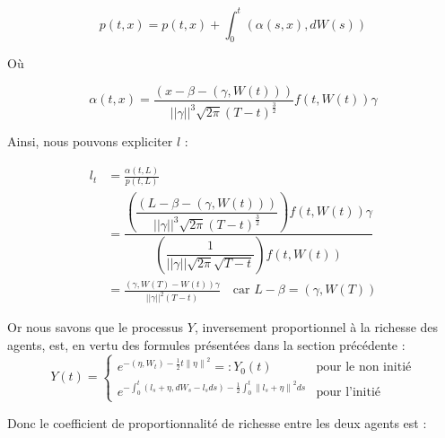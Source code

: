 \documentclass[../finalreport.tex]{subfiles}
\begin{document}
\begin{displaymath}
p \left( t, x \right) = p \left( t, x \right) + \int_0^t \left( \alpha \left(s, x \right), dW \left( s \right) \right)
\end{displaymath}

\par Où

\begin{displaymath}
\alpha \left( t, x \right) = \frac{\left( x - \beta - \left( \gamma, W \left( t \right) \right) \right)}{||\gamma||^3 \sqrt{2 \pi} \left( T - t \right)^{\frac{3}{2}}} f \left( t, W \left( t \right) \right) \gamma
\end{displaymath}

\par Ainsi, nous pouvons expliciter $l$ : 

\begin{displaymath}
	\begin{split}
	l_t &= \frac{\alpha \left(t, L \right)}{p \left(t, L \right)} \\
	&= \dfrac{ \left( \dfrac{\left( L - \beta - \left( \gamma, W \left( t \right) \right) \right)}{||\gamma||^3 \sqrt{2 \pi} \left( T - t \right)^{\frac{3}{2}}} \right) f \left( t, W \left( t \right) \right) \gamma}{ \left( \dfrac{1}{ ||\gamma|| \sqrt{2 \pi} \sqrt{T - t}} \right) f \left( t, W \left( t \right) \right)} \\
	&= \frac{\left( \gamma, W \left( T \right) - W \left( t \right) \right) \gamma}{||\gamma||^2 \left( T - t \right)} \quad \text{car } L - \beta = \left( \gamma, W \left( T \right) \right)
	\end{split}
\end{displaymath}

\par Or nous savons que le processus $Y$, inversement proportionnel à la richesse des agents, est, en vertu des formules présentées dans la section précédente :
\begin{displaymath}
Y \left( t \right) = 
\begin{cases}
e^{- \left( \eta, W_{t} \right)-\frac{1}{2} t {\| \eta \|}^{2}} =: Y_0 \left( t \right) & \text{pour le non initié} \\
e^{- \int_{0}^{t} \left( l_{s} + \eta, dW_{s} - l_s ds \right) - \frac{1}{2} \int_{0}^{t} {\| l_{s} + \eta \|}^{2} ds} & \text{pour l'initié}
\end{cases}
\end{displaymath}

\par Donc le coefficient de proportionnalité de richesse entre les deux agents est : 
\end{document}
